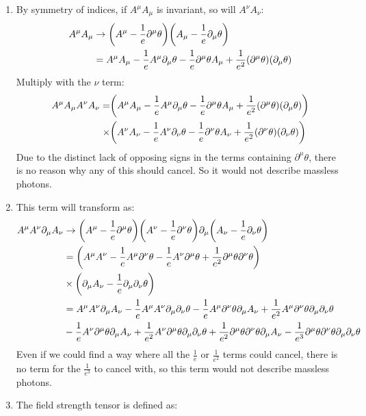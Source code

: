 \documentclass[12pt]{article}
\newcommand{\D}{\partial}
\begin{document}
\begin{enumerate}
\item By symmetry of indices, if $A^\mu A_\mu$ is invariant, so will $A^\nu A_\nu$:
  \begin{align*}
    A^\mu A_\mu&\to\qty(A^\mu-\frac{1}{e}\D^\mu\theta)
    \qty(A_\mu-\frac{1}{e}\D_\mu\theta)\\
    &=A^\mu A_\mu-\frac{1}{e}A^\mu\D_\mu\theta-\frac{1}{e}\D^\mu\theta A_\mu
    +\frac{1}{e^2}\qty(\D^\mu\theta)\qty(\D_\mu\theta)
  \end{align*}
  Multiply with the $\nu$ term:
  \begin{align*}
    A^\mu A_\mu A^\nu A_\nu=&
    \qty(A^\mu A_\mu-\frac{1}{e}A^\mu\D_\mu\theta-\frac{1}{e}\D^\mu\theta A_\mu
    +\frac{1}{e^2}\qty(\D^\mu\theta)\qty(\D_\mu\theta))\\\times&
    \qty(A^\nu A_\nu-\frac{1}{e}A^\nu\D_\nu\theta-\frac{1}{e}\D^\nu\theta A_\nu
    +\frac{1}{e^2}\qty(\D^\nu\theta)\qty(\D_\nu\theta))
  \end{align*}
  Due to the distinct lack of opposing signs in the terms containing $\D^\mu\theta$, there is no reason why any of this should cancel. So it would not describe massless photons. 
\item This term will transform as:
  \begin{align*}
    A^\mu A^\nu\D_\mu A_\nu&\to
    \qty(A^\mu-\frac{1}{e}\D^\mu\theta)
    \qty(A^\nu-\frac{1}{e}\D^\nu\theta)
    \D_\mu\qty(A_\nu-\frac{1}{e}\D_\nu\theta)\\
    &=\qty(A^\mu A^\nu-\frac{1}{e}A^\mu\D^\nu\theta-\frac{1}{e}A^\nu\D^\mu\theta
    +\frac{1}{e^2}\D^\mu\theta\D^\nu\theta)\\
    &\times\qty(\D_\mu A_\nu-\frac{1}{e}\D_\mu\D_\nu\theta)\\
    &=A^\mu A^\nu\D_\mu A_\nu-\frac{1}{e}A^\mu A^\nu\D_\mu\D_\nu\theta
    -\frac{1}{e}A^\mu\D^\nu\theta\D_\mu A_\nu
    +\frac{1}{e^2}A^\mu\D^\nu\theta\D_\mu\D_\nu\theta\\
    &-\frac{1}{e}A^\nu\D^\mu\theta\D_\mu A_\nu
    +\frac{1}{e^2}A^\nu\D^\mu\theta\D_\mu\D_\nu\theta
    +\frac{1}{e^2}\D^\mu\theta\D^\nu\theta\D_\mu A_\nu
    -\frac{1}{e^3}\D^\mu\theta\D^\nu\theta\D_\mu\D_\nu\theta
  \end{align*}
  Even if we could find a way where all the $\frac{1}{e}$ or $\frac{1}{e^2}$ terms could cancel, there is no term for the $\frac{1}{e^3}$ to cancel with, so this term would not describe massless photons.
\item The field strength tensor is defined as:

\end{enumerate}
\end{document}
